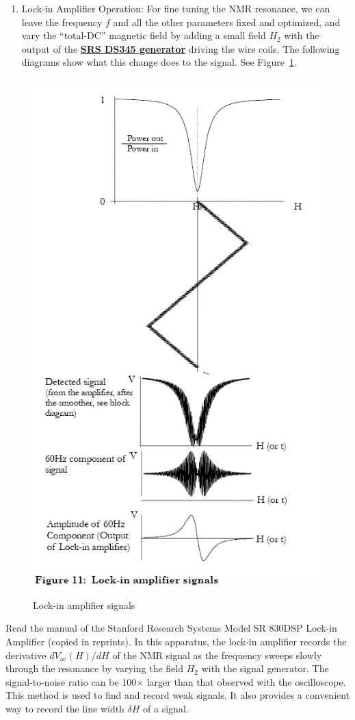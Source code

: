 \documentclass{../lab}
\begin{document}
\begin{enumerate}
    \item Lock-in Amplifier Operation: For fine tuning the NMR resonance, we can leave the frequency $f$ and all the other parameters fixed and optimized, and vary the ``total-DC'' magnetic field by adding a small field $H_2$ with the output of the \href{https://youtu.be/PrM8DHFOFS0}{\textbf{SRS DS345 generator}} driving the wire coils. The following diagrams show what this change does to the signal. See Figure~\ref{fig:LockInAmplifierSignals}.
\end{enumerate}

\begin{figure}[h]
    \centering
    \href{http://experimentationlab.berkeley.edu/sites/default/files/images/NMR25.gif}{\includegraphics[width=0.5\linewidth]{images/NMR25.png}}
    \caption{Lock-in amplifier signals}
    \label{fig:LockInAmplifierSignals}
\end{figure}

Read the manual of the Stanford Research Systems Model SR 830DSP Lock-in Amplifier (copied in reprints). In this apparatus, the lock-in amplifier records the derivative $dV_\text{ac}(H)/dH$ of the NMR signal as the frequency sweeps slowly through the resonance by varying the field $H_2$ with the signal generator. The signal-to-noise ratio can be 100$\times$ larger than that observed with the oscilloscope. This method is used to find and record weak signals. It also provides a convenient way to record the line width $\delta H$ of a signal.
\end{document}
